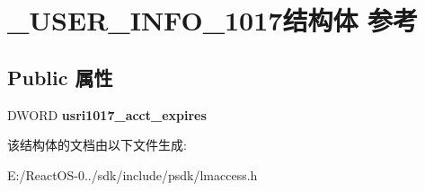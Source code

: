 \hypertarget{struct___u_s_e_r___i_n_f_o__1017}{}\section{\+\_\+\+U\+S\+E\+R\+\_\+\+I\+N\+F\+O\+\_\+1017结构体 参考}
\label{struct___u_s_e_r___i_n_f_o__1017}
\subsection*{Public 属性}
\begin{DoxyCompactItemize}
\item 
\mbox{\label{struct___u_s_e_r___i_n_f_o__1017_a11d0ef13d7ea247f334fb7d0c613e8c8}} 
D\+W\+O\+RD {\bfseries usri1017\+\_\+acct\+\_\+expires}
\end{DoxyCompactItemize}


该结构体的文档由以下文件生成\+:\begin{DoxyCompactItemize}
\item 
E\+:/\+React\+O\+S-\/0../sdk/include/psdk/lmaccess.\+h\end{DoxyCompactItemize}
